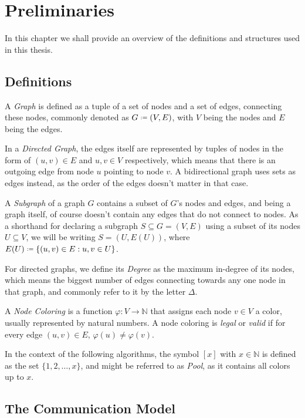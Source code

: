 
\chapter{Preliminaries}
\label{ch:preliminaries}

In this chapter we shall provide an overview of the definitions and structures used in this thesis.

\section{Definitions}

A \textit{Graph} is defined as a tuple of a set of nodes and a set of edges, connecting these nodes, commonly denoted as $G \defines (V, E)$, with $V$ being the nodes and $E$ being the edges.

In a \textit{Directed Graph}, the edges itself are represented by tuples of nodes in the form of $(u,v)\in E$ and $u, v \in V$ respectively, which means that there is an outgoing edge from node $u$ pointing to node $v$. A bidirectional graph uses sets as edges instead, as the order of the edges doesn't matter in that case.

A \textit{Subgraph} of a graph $G$ contains a subset of $G$'s nodes and edges, and being a graph itself, of course doesn't contain any edges that do not connect to nodes. As a shorthand for declaring a subgraph $S \subseteq G = (V, E)$ using a subset of its nodes $U \subseteq V$, we will be writing $S = (U, E(U))$, where $E(U) \defines \{(u,v)\in E : u,v\in U\}$.

For directed graphs, we define its \textit{Degree} as the maximum in-degree of its nodes, which means the biggest number of edges connecting towards any one node in that graph, and commonly refer to it by the letter $\Delta$.

A \textit{Node Coloring} is a function $\varphi : V \rightarrow \mathbb{N}$ that assigns each node $v\in V$ a color, usually represented by natural numbers. A node coloring is \textit{legal} or \textit{valid} if for every edge $(u, v)\in E$, $\varphi (u) \neq \varphi (v)$.

In the context of the following algorithms, the symbol $[x]$ with $x \in \mathbb{N}$ is defined as the set $\{1, 2, \dots , x\}$, and might be referred to as \textit{Pool}, as it contains all colors up to $x$.

\section{The Communication Model}\label{section:comm}

